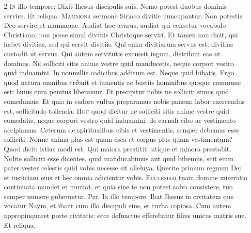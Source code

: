 \begin{multicols*}{2}
\lettrine[lines=2]{\zallmancaps \color{Blue} I}{n} illo tempore: Dixit Ihesus discipulis suis. Nemo potest duobus dominis servire. Et reliqua.
\lettrine[lines=2]{\zallmancaps \color{Red} M}{ammona} sermone Siriaco divitie nuncupantur. Non potestis Deo servire et mammone. Audiat hoc avarus, audiat qui censetur vocabulo Christiano, non posse simul divitiis Christoque serviri. Et tamen non dicit, qui habet divitias, sed qui servit divitiis. Qui enim divitiarum servus est, divitias custodit ut servus. Qui autem servitutis excussit iugum, distribuit eas ut dominus.
\lettrine[lines=2]{\zallmancaps \color{Blue} N}{e} solliciti sitis anime vestre quid manducetis, neque corpori vestro quid induamini. In nonnullis codicibus additum est. Neque quid bibatis. Ergo quod natura omnibus tribuit et iumentis ac bestiis hominibus quoque commune est: huius cura penitus liberamur. Et precipitur nobis ne solliciti simus quid comedamus. Et quia in sudore vultus preparamus nobis panem: labor exercendus est, sollicitudo tollenda.
\lettrine[lines=2]{\zallmancaps \color{Red} H}{oc} quod dicitur ne solliciti sitis anime vestre quid comedatis, neque corpori vestro quid induamini: de carnali cibo ac vestimento accipiamus. Ceterum de spiritualibus cibis et vestimentis: semper debemus esse solliciti. Nonne anima plus est quam esca et corpus plus quam vestimentum? Quod dicit: istius modi est. Qui maiora prestitit: utique et minora prestabit.
 Nolite solliciti esse dicentes, quid manducabimus aut quid bibemus, scit enim pater vester celestis quid vobis necesse sit alleluya.
 Querite primum regnum Dei et iusticiam eius et hec omnia adicientur vobis.
\lettrine[lines=2]{\zallmancaps \color{Blue} E}{cclesiam} tuam domine miseratio continuata mundet et muniat, et quia sine te non potest salva consistere, tuo semper munere gubernetur. Per.
\lettrine[lines=2]{\zallmancaps \color{Red} I}{n} illo tempore: Ibat Ihesus in civitatem que vocatur Naym, et ibant cum illo discipuli eius, et turba copiosa. Cum autem appropinquaret porte civitatis: ecce defunctus efferebatur filius unicus matris sue. Et reliqua.

\end{multicols*}
